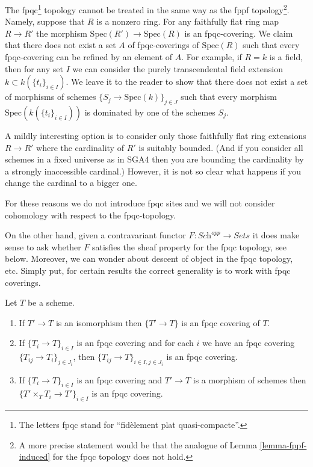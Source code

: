 \noindent
The fpqc\footnote{The letters fpqc stand for
``fid\`element plat quasi-compacte''.}
topology cannot be treated in the same way as the fppf
topology\footnote{A more precise statement would be that the analogue of
Lemma \ref{lemma-fppf-induced} for the fpqc topology does not hold.}.
Namely, suppose that $R$ is a nonzero ring. For any faithfully flat
ring map $R \to R'$ the morphism $\text{Spec}(R') \to \text{Spec}(R)$
is an fpqc-covering. We claim that there does not exist a set $A$ of
fpqc-coverings of $\text{Spec}(R)$ such that every fpqc-covering can
be refined by an element of $A$. For example, if $R = k$ is a field,
then for any set $I$ we can consider the purely transcendental field extension
$k \subset k(\{t_i\}_{i \in I})$. We leave it to the reader to show
that there does not exist a set of morphisms of schemes
$\{S_j \to \text{Spec}(k)\}_{j \in J}$ such that every morphism
$\text{Spec}(k(\{t_i\}_{i \in I}))$ is dominated by one of
the schemes $S_j$.

\medskip\noindent
A mildly interesting option is to consider only those faithfully flat ring
extensions $R \to R'$ where the cardinality of $R'$ is suitably bounded.
(And if you consider all schemes in a fixed universe as in SGA4 then you
are bounding the cardinality by a strongly inaccessible cardinal.)
However, it is not so clear what happens if you change the cardinal
to a bigger one.

\medskip\noindent
For these reasons we do not introduce fpqc sites and we will not consider
cohomology with respect to the fpqc-topology.

\medskip\noindent
On the other hand, given a contravariant functor
$F : \textit{Sch}^{opp} \to \textit{Sets}$
it does make sense to ask whether $F$ satisfies the sheaf property
for the fpqc topology, see below.
Moreover, we can wonder about descent of object
in the fpqc topology, etc. Simply put, for certain results the correct
generality is to work with fpqc coverings.

\begin{lemma}
\label{lemma-fpqc}
Let $T$ be a scheme.
\begin{enumerate}
\item If $T' \to T$ is an isomorphism then $\{T' \to T\}$
is an fpqc covering of $T$.
\item If $\{T_i \to T\}_{i\in I}$ is an fpqc covering and for each
$i$ we have an fpqc covering $\{T_{ij} \to T_i\}_{j\in J_i}$, then
$\{T_{ij} \to T\}_{i \in I, j\in J_i}$ is an fpqc covering.
\item If $\{T_i \to T\}_{i\in I}$ is an fpqc covering
and $T' \to T$ is a morphism of schemes then
$\{T' \times_T T_i \to T'\}_{i\in I}$ is an fpqc covering.
\end{enumerate}
\end{lemma}

